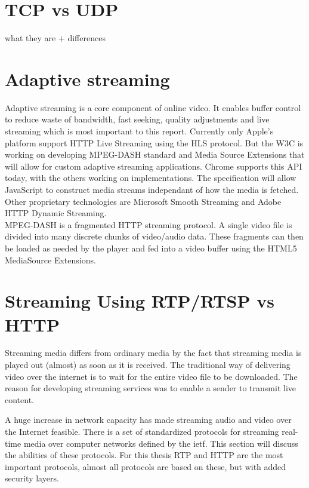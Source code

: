 \section{TCP vs UDP}
what they are + differences

\section{Adaptive streaming}
Adaptive streaming is a core component of online video. It enables buffer control to reduce waste of bandwidth, fast seeking, quality adjustments and live streaming which is most important to this report. Currently only Apple’s platform support HTTP Live Streaming using the HLS protocol. But the W3C is working on developing MPEG-DASH standard and Media Source Extensions that will allow for custom adaptive streaming applications. Chrome supports this API today, with the others working on implementations. The specification will allow JavaScript to construct media streams independant of how the media is fetched.
Other proprietary technologies are Microsoft Smooth Streaming and Adobe HTTP Dynamic Streaming.
\\
MPEG-DASH is a fragmented HTTP streaming protocol. A single video file is divided into many discrete chunks of video/audio data. These fragments can then be loaded as needed by the player and fed into a video buffer using the HTML5 MediaSource Extensions.

\section{Streaming Using RTP/RTSP vs HTTP}
Streaming media differs from ordinary media by the fact that streaming media is played out (almost) as soon as it is received. The traditional way of delivering video over the internet is to wait for the entire video file to be downloaded. The reason for developing streaming services was to enable a sender to transmit live content.

A huge increase in network capacity has made streaming audio and video over the Internet feasible. There is a set of standardized protocols for streaming real-time media over computer networks defined by the \gls{ietf}. This section will discuss the abilities of these protocols. For this thesis RTP and HTTP are the most important protocols, almost all protocols are based on these, but with added security layers.

